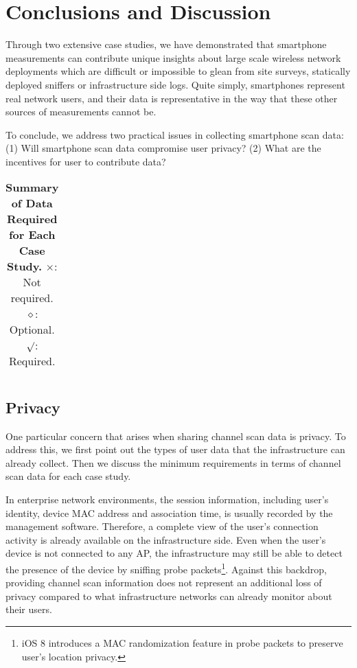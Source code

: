 \section{Conclusions and Discussion}
\label{sec:conclusion}

Through two extensive case studies, we have demonstrated that smartphone
measurements can contribute unique insights about large scale wireless network
deployments which are difficult or impossible to glean from site surveys,
statically deployed sniffers or infrastructure side logs. Quite simply,
smartphones represent real network users, and their data is representative in
the way that these other sources of measurements cannot be.

To conclude, we address two practical issues in collecting smartphone
scan data: (1) Will smartphone scan data compromise user privacy? (2) What
are the incentives for user to contribute data? 

\begin{table*}[t!]
  \centering
  \begin{tabular}{cccccccc}
    
  \end{tabular}
  \caption{\textbf{Summary of Data Required for Each Case Study.} $\times$: Not
  required. $\diamond$: Optional. $\surd$: Required.}
  \label{tab:privacy}
  \vspace*{\aftercaptiongap}
\end{table*}

\subsection{Privacy}
\label{subsec:privacy}

One particular concern that arises when sharing channel scan data is privacy.
To address this, we first point out the types of user data that the
infrastructure can already collect. Then we discuss the minimum
requirements in terms of channel scan data for each case study.

In enterprise network environments, the \wifi{} session information,
including user's identity, device MAC address and association time, is usually
recorded by the management software. Therefore, a complete view of the user's
\wifi{} connection activity is already available on the infrastructure side.
Even when the user's device is not connected to any AP, the infrastructure
may still be able to detect the presence of the device by sniffing probe
packets\footnote{iOS 8 introduces a MAC randomization feature in probe
packets to preserve user's location privacy.}. Against this backdrop,
providing channel scan information does not represent an additional loss of
privacy compared to what infrastructure networks can already monitor about
their users.

